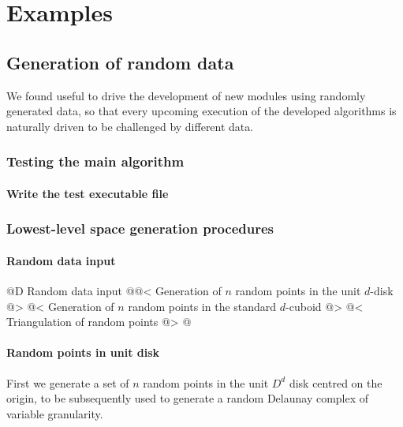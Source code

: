 \documentclass[11pt,oneside]{article}	%
\begin{document}
\section{Examples}
\subsection{Generation of random data}

We found useful to drive the development of new modules using randomly generated data, so that every upcoming execution of the developed algorithms is naturally driven to be challenged by different data.

\subsubsection{Testing the main algorithm}

\paragraph{Write the test executable file}




\subsubsection{Lowest-level space generation procedures}

\paragraph{Random data input} 

@D Random data input 
@{@< Generation of $n$ random points in the unit $d$-disk @>
@< Generation of $n$ random points in the standard $d$-cuboid @>
@< Triangulation of random points @>
@}

\paragraph{Random points in unit disk} 
First we generate a  set of $n$ random points in the unit $D^d$ disk centred on the origin, to be subsequently used to generate a random Delaunay complex of variable granularity.
\end{document}
